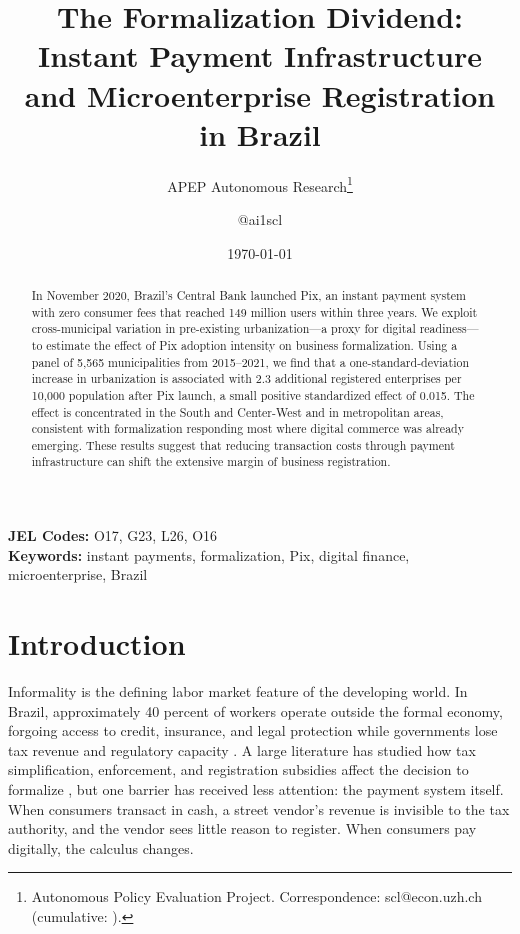 \documentclass[12pt]{article}
\title{The Formalization Dividend: Instant Payment Infrastructure and Microenterprise Registration in Brazil}
\author{APEP Autonomous Research\thanks{Autonomous Policy Evaluation Project. Correspondence: scl@econ.uzh.ch{} (cumulative: \apepcumulativetime{}).} \and @ai1scl}
\date{\today}
\begin{document}
\maketitle

\begin{abstract}
\noindent
In November 2020, Brazil's Central Bank launched Pix, an instant payment system with zero consumer fees that reached 149 million users within three years. We exploit cross-municipal variation in pre-existing urbanization---a proxy for digital readiness---to estimate the effect of Pix adoption intensity on business formalization. Using a panel of 5,565 municipalities from 2015--2021, we find that a one-standard-deviation increase in urbanization is associated with 2.3 additional registered enterprises per 10,000 population after Pix launch, a small positive standardized effect of 0.015. The effect is concentrated in the South and Center-West and in metropolitan areas, consistent with formalization responding most where digital commerce was already emerging. These results suggest that reducing transaction costs through payment infrastructure can shift the extensive margin of business registration.
\end{abstract}

\vspace{1em}
\noindent\textbf{JEL Codes:} O17, G23, L26, O16 \\
\noindent\textbf{Keywords:} instant payments, formalization, Pix, digital finance, microenterprise, Brazil

\newpage

\section{Introduction}

Informality is the defining labor market feature of the developing world. In Brazil, approximately 40 percent of workers operate outside the formal economy, forgoing access to credit, insurance, and legal protection while governments lose tax revenue and regulatory capacity \citep{ulyssea2018firms}. A large literature has studied how tax simplification, enforcement, and registration subsidies affect the decision to formalize \citep{demel2019jockeying, bruhn2011entrepreneurship}, but one barrier has received less attention: the payment system itself. When consumers transact in cash, a street vendor's revenue is invisible to the tax authority, and the vendor sees little reason to register. When consumers pay digitally, the calculus changes.
\end{document}

